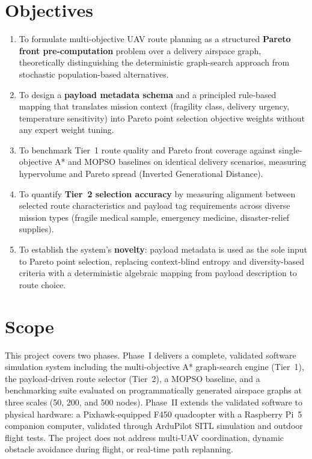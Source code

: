 \documentclass{ssnreview}
\begin{document}
\section{Objectives}
\begin{enumerate}[label=\arabic*.]
  \item To formulate multi-objective UAV route planning as a structured \textbf{Pareto
  front pre-computation} problem over a delivery airspace graph, theoretically
  distinguishing the deterministic graph-search approach from stochastic
  population-based alternatives.
  \item To design a \textbf{payload metadata schema} and a principled rule-based mapping
  that translates mission context (fragility class, delivery urgency, temperature
  sensitivity) into Pareto point selection objective weights without any expert weight
  tuning.
  \item To benchmark Tier~1 route quality and Pareto front coverage against
  single-objective A* and MOPSO baselines on identical delivery scenarios, measuring
  hypervolume and Pareto spread (Inverted Generational Distance).
  \item To quantify \textbf{Tier~2 selection accuracy} by measuring alignment between
  selected route characteristics and payload tag requirements across diverse mission
  types (fragile medical sample, emergency medicine, disaster-relief supplies).
  \item To establish the system's \textbf{novelty}: payload metadata is used as the sole
  input to Pareto point selection, replacing context-blind entropy and diversity-based
  criteria with a deterministic algebraic mapping from payload description to route
  choice.
\end{enumerate}

\section{Scope}

This project covers two phases. Phase~I delivers a complete, validated software
simulation system including the multi-objective A* graph-search engine (Tier~1), the
payload-driven route selector (Tier~2), a MOPSO baseline, and a benchmarking suite
evaluated on programmatically generated airspace graphs at three scales (50, 200, and
500 nodes). Phase~II extends the validated software to physical hardware: a
Pixhawk-equipped F450 quadcopter with a Raspberry Pi~5 companion computer, validated
through ArduPilot SITL simulation and outdoor flight tests. The project does not address
multi-UAV coordination, dynamic obstacle avoidance during flight, or real-time path
replanning.
\end{document}
